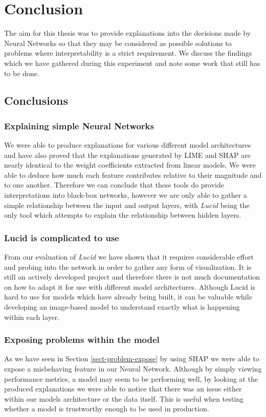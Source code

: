 \chapter{Conclusion}
The aim for this thesis was to provide explanations into the decisions made by Neural Networks so that they may be considered as possible solutions to problems where interpretability is a strict requirement. We discuss the findings which we have gathered during this experiment and note some work that still has to be done.
\section{Conclusions}
\subsection{Explaining simple Neural Networks}
We were able to produce explanations for various different model architectures and have also proved that the explanations generated by LIME and SHAP are nearly identical to the weight coefficients extracted from linear models. We were able to deduce how much each feature contributes relative to their magnitude and to one another. Therefore we can conclude that these tools do provide interpretations into black-box networks, however we are only able to gather a simple relationship between the input and output layers, with \emph{Lucid} being the only tool which attempts to explain the relationship between hidden layers.
\subsection{Lucid is complicated to use}
From our evaluation of \emph{Lucid} we have shown that it requires considerable effort and probing into the network in order to gather any form of visualization. It is still an actively developed project and therefore there is not much documentation on how to adapt it for use with different model architectures. Although Lucid is hard to use for models which have already being built, it can be valuable while developing an image-based model to understand exactly what is happening within each layer.
\subsection{Exposing problems within the model}
As we have seen in Section \ref{sect-problem-expose} by using SHAP we were able to expose a misbehaving feature in our Neural Network. Although by simply viewing performance metrics, a model may seem to be performing well, by looking at the produced explanations we were able to notice that there was an issue either within our models architecture or the data itself. This is useful when testing whether a model is trustworthy enough to be used in production.
